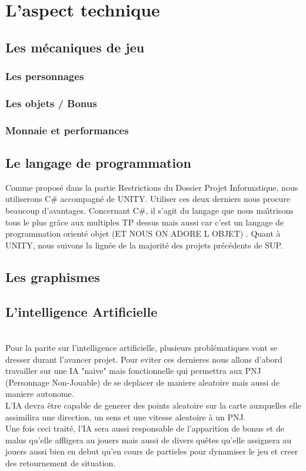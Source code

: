 \documentclass[12pt]{report}
\begin{document}
\chapter{L'aspect technique} 
    \section{Les mécaniques de jeu}
        \subsection{Les personnages}
        \subsection{Les objets / Bonus}
        \subsection{Monnaie et performances}
    \section{Le langage de programmation}

Comme proposé dans la partie Restrictions du Dossier Projet Informatique, nous utiliserons C# accompagné de UNITY.
Utiliser ces deux derniers nous procure beaucoup d’avantages. Concernant
C#, il s’agit du langage que nous maı̂trisons tous le plus grâce aux multiples
TP dessus mais aussi car c'est un langage de programmation orienté objet (ET NOUS ON ADORE L OBJET) . 
Quant à UNITY, nous suivons la lignée de la majorité des projets précédents
de SUP. 
    \section{Les graphismes}
    \section{L'intelligence Artificielle}
\\ Pour la parite sur l'intelligence artificielle, plusieurs problématiques vont se dresser durant l'avancer projet. \newline
Pour eviter ces dernieres nous allons d'abord travailler sur une IA "naive" mais fonctionnelle qui permettra aux PNJ (Personnage Non-Jouable) de se deplacer de maniere aleatoire mais aussi de maniere autonome.\\ L'IA devra être capable de generer des points aleatoire sur la carte auxquelles elle assimilira une direction, un sens et une vitesse aleatoire à un PNJ.\\ Une fois ceci traité, l'IA sera aussi responsable de l'apparition de bonus et de malus qu'elle affligera au jouers mais aussi de divers quêtes qu'elle assignera au jouers aussi bien en debut qu'en cours de partieles pour dynamiser le jeu et creer des retournement de situation.
\end{document}
